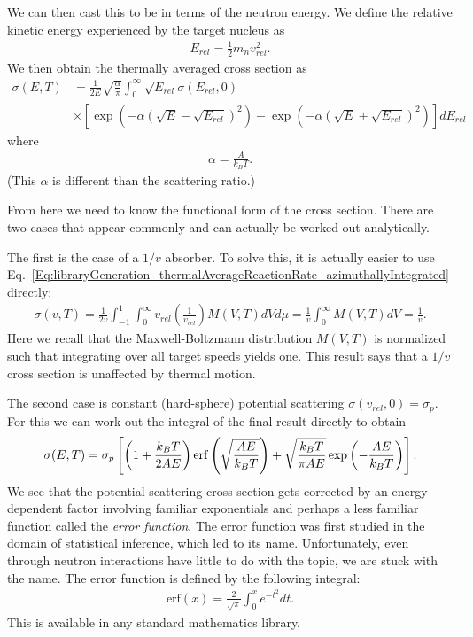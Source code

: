 We can then cast this to be in terms of the neutron energy. We define the relative kinetic energy experienced by the target nucleus as
\begin{align}
  E_{rel} = \frac{1}{2} m_n v_{rel}^2 . \nonumber
\end{align}
We then obtain the thermally averaged cross section as
\begin{align}
   \sigma(E,T) &= \frac{1}{2 E} \sqrt{ \frac{\alpha}{\pi} } \int_0^\infty \sqrt{E_{rel}} \sigma(E_{rel},0) \nonumber \\ &\times \left[ \exp\left( -\alpha \left( \sqrt{E} - \sqrt{E_{rel}} \right)^2 \right) -  \exp\left( -\alpha \left( \sqrt{E} + \sqrt{E_{rel}} \right)^2 \right) \right] dE_{rel}  \label{Eq:libraryGeneration_thermalAveragedXS_energy}
\end{align}
where
\begin{align}
  \alpha = \frac{A}{k_B T} .
\end{align}
(This $\alpha$ is different than the scattering ratio.)

From here we need to know the functional form of the cross section. There are two cases that appear commonly and can actually be worked out analytically. 

The first is the case of a $1/v$ absorber. To solve this, it is actually easier to use Eq.~\eqref{Eq:libraryGeneration_thermalAverageReactionRate_azimuthallyIntegrated} directly:
\begin{align}
  \sigma(v,T) = \frac{1}{2v} \int_{-1}^1 \int_0^\infty v_{rel} \left( \frac{1}{v_{rel}} \right)  M(V,T) dV d\mu  = \frac{1}{v}  \int_0^\infty  M(V,T) dV = \frac{1}{v} .
\end{align}
Here we recall that the Maxwell-Boltzmann distribution $M(V,T)$ is normalized such that integrating over all target speeds yields one. This result says that a $1/v$ cross section is unaffected by thermal motion.

The second case is constant (hard-sphere) potential scattering $\sigma(v_{rel},0) = \sigma_p$. For this we can work out the integral of the final result directly to obtain
\begin{align}
  \sigma(E,T) = \sigma_p \left[  \left( 1 + \frac{ k_B T }{ 2 A E } \right) \mathrm{erf} \left( \sqrt{\frac{AE}{k_B T}} \right) + \sqrt{ \frac{ k_B T }{ \pi A E } } \exp \left( -\frac{AE}{k_B T} \right) \right]. \label{Eq:libraryGeneration_FreeGasScatteringXS}
\end{align}
We see that the potential scattering cross section gets corrected by an energy-dependent factor involving familiar exponentials and perhaps a less familiar function called the \emph{error function}. The error function was first studied in the domain of statistical inference, which led to its name. Unfortunately, even through neutron interactions have little to do with the topic, we are stuck with the name. The error function is defined by the following integral:
\begin{align}
   \text{erf}(x) = \frac{2}{\sqrt{\pi}} \int_0^x e^{-t^2}  dt .
\end{align}
This is available in any standard mathematics library.

